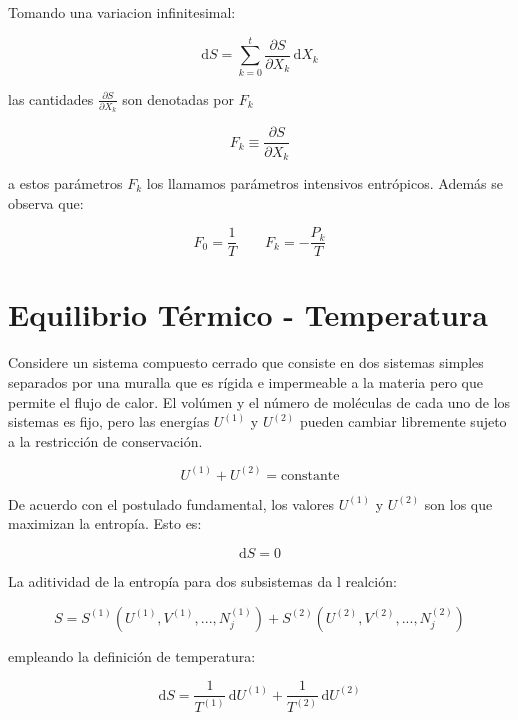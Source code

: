 \documentclass[10pt,twocolumn]{IEEEtran2e}
\newcommand{\ud}{\mathrm{d}}
\begin{document}
Tomando una variacion infinitesimal:

\begin{equation}
 \ud S= \sum_{k=0}^{t} \frac{\partial S}{\partial X_{k}}\, \ud X_{k}
\end{equation}

las cantidades $\frac{\partial S}{\partial X_{k}}$ son denotadas por $F_{k}$

\begin{equation}
 F_{k}\equiv \frac{\partial S}{\partial X_{k}}
\end{equation}

a estos par\'ametros $F_{k}$ los llamamos par\'ametros intensivos entr\'opicos. Adem\'as se observa que:

\begin{equation}
 F_{0}=\frac{1}{T} \qquad F_{k}=- \frac{P_{k}}{T}
\end{equation}


\section{Equilibrio T\'ermico - Temperatura}

Considere un sistema compuesto cerrado que consiste en dos sistemas simples separados por una muralla que es r\'igida e impermeable a la materia pero que permite el flujo de calor. El vol\'umen y el n\'umero de mol\'eculas de cada uno de los sistemas es fijo, pero las energ\'ias $U^{(1)}$ y $U^{(2)}$ pueden cambiar libremente sujeto a la restricci\'on de conservaci\'on.

\begin{equation}
 U^{(1)}+U^{(2)} = \textrm{constante}
\end{equation}

De acuerdo con el postulado fundamental, los valores $U^{(1)}$ y $U^{(2)}$ son los que maximizan la entrop\'ia. Esto es:

\begin{equation}
 \ud S=0
\end{equation}

La aditividad de la entrop\'ia para dos subsistemas da l realci\'on:

\begin{equation}
 S= S^{(1)}(U^{(1)}, V^{(1)}, ... ,N_{j}^{(1)})+S^{(2)}(U^{(2)}, V^{(2)}, ... ,N_{j}^{(2)})
\end{equation}

empleando la definici\'on de temperatura:

\begin{equation}
 \ud S=\frac{1}{T^{(1)}}\, \ud U^{(1)} + \frac{1}{T^{(2)}}\, \ud U^{(2)}
\end{equation}
\end{document}
